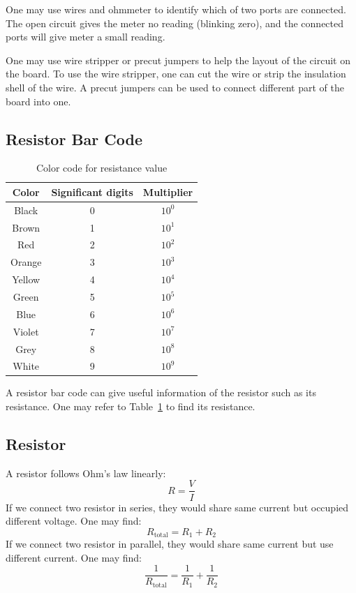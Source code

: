 \documentclass[aps,prl,reprint]{revtex4-1}
\begin{document}
    One may use wires and ohmmeter to identify which of two ports are connected. The open circuit gives the meter no reading (blinking zero), and the connected ports will give meter a small reading.

    One may use wire stripper or precut jumpers to help the layout of the circuit on the board. To use the wire stripper, one can cut the wire or strip the insulation shell of the wire. A precut jumpers can be used to connect different part of the board into one.

    \subsection{Resistor Bar Code}
        \begin{table}
        \begin{ruledtabular}
        \begin{tabular}{ccc} 
        Color & Significant digits & Multiplier\\
        \hline
        \hline
        Black & 0 & $10^0$ \\ 
        \hline
        Brown & 1 & $10^1$ \\
        \hline
        Red & 2 & $10^2$ \\
        \hline
        Orange & 3 & $10^3$ \\
        \hline
        Yellow & 4 & $10^4$ \\ 
        \hline
        Green & 5 & $10^5$ \\ 
        \hline
        Blue & 6 & $10^6$ \\ 
        \hline
        Violet & 7 & $10^7$ \\ 
        \hline
        Grey & 8 & $10^8$ \\ 
        \hline
        White & 9 & $10^9$ \\ 
        \end{tabular}
        \end{ruledtabular}
        \caption{Color code for resistance value}
        \label{table:1}
        \end{table}
    A resistor bar code can give useful information of the resistor such as its resistance. One may refer to Table~\ref{table:1} to find its resistance.
    \subsection{Resistor}
    A resistor follows Ohm's law linearly:
    \[
    R = \frac{V}{I}
    \]
    If we connect two resistor in series, they would share same current but occupied different voltage. One may find:
    \[
    R_\text{total} = R_1 + R_2
    \]
    If we connect two resistor in parallel, they would share same current but use different current. One may find:
    \[
    \frac{1}{R_\text{total}} = \frac{1}{R_1} + \frac{1}{R_2}
    \]
\end{document}
